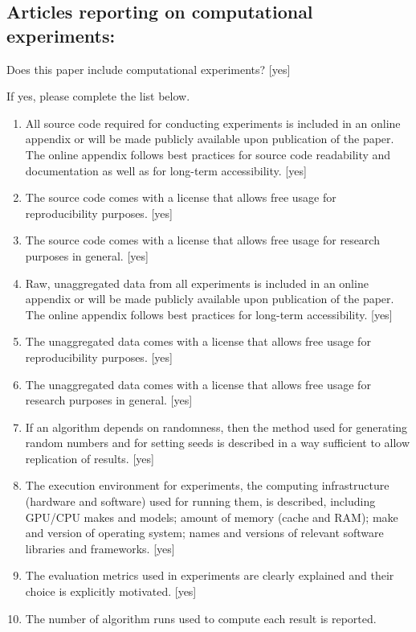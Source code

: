 \documentclass[manuscript, screen, review]{jair}
\begin{document}
\subsection*{Articles reporting on computational experiments:}
Does this paper include computational experiments? [yes]

If yes, please complete the list below.
\begin{enumerate}
    \item 
    All source code required for conducting experiments is included in an online appendix 
    or will be made publicly available upon publication of the paper.
    The online appendix follows best practices for source code readability and documentation as well as for long-term accessibility.
    [yes]
    \item The source code comes with a license that
    allows free usage for reproducibility purposes.
    [yes]
    \item The source code comes with a license that
    allows free usage for research purposes in general.
    [yes]
    \item 
    Raw, unaggregated data from all experiments is included in an online appendix 
    or will be made publicly available upon publication of the paper.
    The online appendix follows best practices for long-term accessibility.
    [yes]
    \item The unaggregated data comes with a license that
    allows free usage for reproducibility purposes.
    [yes]
    \item The unaggregated data comes with a license that
    allows free usage for research purposes in general.
    [yes]
    \item If an algorithm depends on randomness, then the method used for generating random numbers and for setting seeds is described in a way sufficient to allow replication of results. 
    [yes]
    \item The execution environment for experiments, the computing infrastructure (hardware and software) used for running them, is described, including GPU/CPU makes and models; amount of memory (cache and RAM); make and version of operating system; names and versions of relevant software libraries and frameworks. 
    [yes]
    \item 
    The evaluation metrics used in experiments are clearly explained and their choice is explicitly motivated. 
    [yes]
    \item 
    The number of algorithm runs used to compute each result is reported. 

\end{enumerate}
\end{document}
